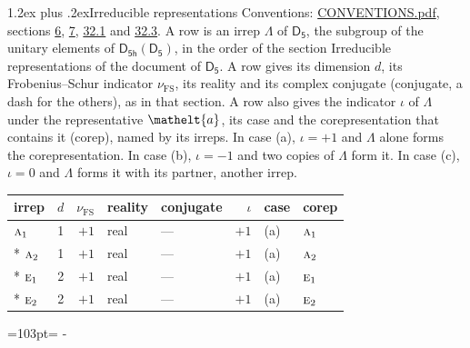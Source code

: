 \documentclass[10pt,a4paper]{article}
\makeatletter
\renewcommand\section{\@startsection{section}{1}{\z@}{-3ex plus -1ex minus -.2ex}%
  {1.2ex plus .2ex}{\normalfont\large\sffamily\bfseries\color{parttitle}}}
\newcommand{\needspace}[1]{\par\penalty-100\begingroup\dimen0=#1\relax\dimen2=\pagegoal
  \advance\dimen2-\pagetotal\ifdim\dimen0>\dimen2\relax\ifdim\dimen2>0pt\vfil\break\fi\fi
  \endgroup}
\numberwithin{equation}{section}
\newcommand{\eltfont}[1]{{\let\sigma\eltsigma\mathelt{#1}}}
\newcommand{\grp}[1]{\mathsf{#1}}
\newcommand{\irr}[1]{\text{\normalfont\scshape #1}}
\newcommand{\elt}[1]{\eltfont{#1}}
\newcommand{\fsind}{\nu_{\mathrm{FS}}}
\makeatother
\begin{document}
\section{Irreducible representations}\label{s:irreps}
Conventions: \href{../../CONVENTIONS.pdf}{CONVENTIONS.pdf}, sections \href{../../../rotation/CONVENTIONS.pdf\#conv.6}{6}, \href{../../../rotation/CONVENTIONS.pdf\#conv.7}{7}, \href{../../CONVENTIONS.pdf\#conv.32.1}{32.1} and \href{../../CONVENTIONS.pdf\#conv.32.3}{32.3}.
\leavevmode\label{n:irrep.Delta}A row is an irrep $\Lambda$ of $\grp{D_{5}}$, the subgroup of the unitary elements of $\grp{D_{5h}}(\grp{D_{5}})$, in the order of the section Irreducible representations of the document of \href{../../../rotation/data/pdf/D5.pdf}{$\grp{D_{5}}$}. \label{n:index.dimension}\label{n:index.frobenius}\label{n:head.irrep}\label{n:head.reality}\label{n:head.conjugate}A row gives its dimension $d$, its Frobenius--Schur indicator $\fsind$, its reality and its complex conjugate (conjugate, a dash for the others), as in that section. \label{n:head.case.corep}\label{n:head.corep}A row also gives the indicator $\iota$ of $\Lambda$ under the representative $\elt{a}$, its case and the corepresentation that contains it (corep), named by its irreps. In case (a), $\iota = +1$ and $\Lambda$ alone forms the corepresentation. In case (b), $\iota = -1$ and two copies of $\Lambda$ form it. In case (c), $\iota = 0$ and $\Lambda$ forms it with its partner, another irrep.
\setlength{\emergencystretch}{2em}\par\setlength{\emergencystretch}{0pt}
{\small\renewcommand{\arraystretch}{1.25}\setlength{\tabcolsep}{4pt}\begin{longtable}{@{}lrrllrll@{}}\toprule
irrep & $d$ & $\fsind$ & reality & conjugate & $\iota$ & case & corep\\\midrule\endhead
\bottomrule\endfoot\endlastfoot
$\irr{a}_{1}$ & 1 & $+1$ & real & --- & $+1$ & (a) & $\irr{a}_{1}$\\*
$\irr{a}_{2}$ & 1 & $+1$ & real & --- & $+1$ & (a) & $\irr{a}_{2}$\\*
$\irr{e}_{1}$ & 2 & $+1$ & real & --- & $+1$ & (a) & $\irr{e}_{1}$\\*
$\irr{e}_{2}$ & 2 & $+1$ & real & --- & $+1$ & (a) & $\irr{e}_{2}$\\
\bottomrule\end{longtable}}
\needspace{103pt}
\end{document}
